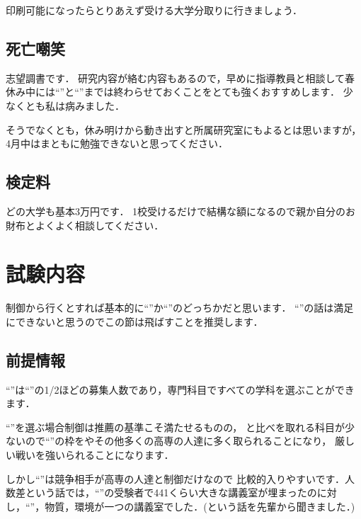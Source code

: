 \documentclass[dvipdfmx]{jsarticle}
\begin{document}
印刷可能になったらとりあえず受ける大学分取りに行きましょう．

\subsection{死亡嘲笑}
志望調書です．
研究内容が絡む内容もあるので，早めに指導教員と相談して春休み中には``''と``''までは終わらせておくことをとても強くおすすめします．
少なくとも私は病みました．

そうでなくとも，休み明けから動き出すと所属研究室にもよるとは思いますが，4月中はまともに勉強できないと思ってください．

\subsection{検定料}
どの大学も基本3万円です．
1校受けるだけで結構な額になるので親か自分のお財布とよくよく相談してください．


\section{試験内容}
制御から行くとすれば基本的に``''か``''のどっちかだと思います．
``''の話は満足にできないと思うのでこの節は飛ばすことを推奨します．
\subsection{前提情報}
``''は``''の1/2ほどの募集人数であり，専門科目ですべての学科を選ぶことができます．

``''を選ぶ場合制御は推薦の基準こそ満たせるものの，
と比べを取れる科目が少ないので``''の枠をやその他多くの高専の人達に多く取られることになり，
厳しい戦いを強いられることになります．

しかし``''は競争相手が高専の人達と制御だけなので
比較的入りやすいです．人数差という話では，``''の受験者で441くらい大きな講義室が埋まったのに対し，``''，物質，環境が一つの講義室でした．(という話を先輩から聞きました．)
\end{document}
